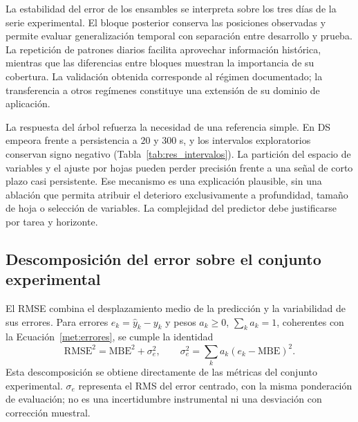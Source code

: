 La estabilidad del error de los ensambles se interpreta sobre los tres días de la serie experimental. El bloque posterior conserva las posiciones observadas y permite evaluar generalización temporal con separación entre desarrollo y prueba. La repetición de patrones diarios facilita aprovechar información histórica, mientras que las diferencias entre bloques muestran la importancia de su cobertura. La validación obtenida corresponde al régimen documentado; la transferencia a otros regímenes constituye una extensión de su dominio de aplicación.

La respuesta del árbol refuerza la necesidad de una referencia simple. En DS empeora frente a persistencia a $20$ y $300$ s, y los intervalos exploratorios conservan signo negativo (Tabla~\ref{tab:res_intervalos}). La partición del espacio de variables y el ajuste por hojas pueden perder precisión frente a una señal de corto plazo casi persistente. Ese mecanismo es una explicación plausible, sin una ablación que permita atribuir el deterioro exclusivamente a profundidad, tamaño de hoja o selección de variables. La complejidad del predictor debe justificarse por tarea y horizonte.

\subsection{Descomposición del error sobre el conjunto experimental}
\label{dis:ruido}

El RMSE combina el desplazamiento medio de la predicción y la variabilidad de sus errores. Para errores $e_k=\widehat y_k-y_k$ y pesos $a_k\geq0$, $\sum_k a_k=1$, coherentes con la Ecuación~\eqref{met:errores}, se cumple la identidad
\begin{equation}
\mathrm{RMSE}^2=\mathrm{MBE}^2+\sigma_e^2,
\qquad
\sigma_e^2=\sum_k a_k(e_k-\mathrm{MBE})^2.
\label{eq:dis_descomposicion_error}
\end{equation}
Esta descomposición se obtiene directamente de las métricas del conjunto experimental. $\sigma_e$ representa el RMS del error centrado, con la misma ponderación de evaluación; no es una incertidumbre instrumental ni una desviación con corrección muestral.

